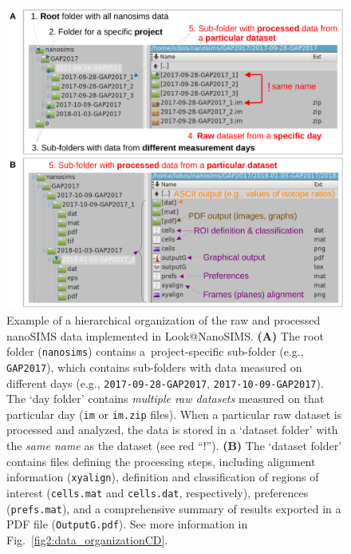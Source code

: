 \documentclass[a4paper, 11pt]{article}
\newcommand{\ttt}[1]{\texttt{#1}}
\newcounter{step}
\begin{document}
\begin{figure}[!t]
\centering
\includegraphics[scale=0.5]{figs2/folders_organizationAB}
\caption{\label{fig2:data_organizationAB}%
	Example of a hierarchical organization of the raw and processed nanoSIMS data implemented in Look@NanoSIMS. %
  \textbf{(A)} The root folder (\ttt{nanosims}) contains a~project-specific sub-folder (e.g., \ttt{GAP2017}), which contains sub-folders with data measured on different days (e.g., \ttt{2017-09-28-GAP2017}, \ttt{2017-10-09-GAP2017}). %
  The `day folder' contains \emph{multiple raw datasets} measured on that particular day (\ttt{im} or \ttt{im.zip} files). %
  When a particular raw dataset is processed and analyzed, the data is stored in a `dataset folder' with the \emph{same name} as the dataset (see red ``!''). %
  \textbf{(B)} The `dataset folder' contains files defining the processing steps, including alignment information (\ttt{xyalign}), definition and classification of regions of interest (\ttt{cells.mat} and \ttt{cells.dat}, respectively), preferences (\ttt{prefs.mat}), and a comprehensive summary of results exported in a PDF file (\ttt{OutputG.pdf}). %
  See more information in Fig.~\ref{fig2:data_organizationCD}.%
}
\end{figure}
\end{document}
